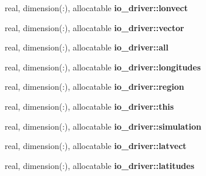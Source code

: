\begin{DoxyCompactItemize}
\item 
\hypertarget{namespaceio__driver_a2f85981326c1a44f2022a3573a859612}{}real, dimension(\+:), allocatable {\bfseries io\+\_\+driver\+::lonvect}\label{namespaceio__driver_a2f85981326c1a44f2022a3573a859612}

\item 
\hypertarget{namespaceio__driver_ae02998f9058178e7d11f21c8b331e76b}{}real, dimension(\+:), allocatable {\bfseries io\+\_\+driver\+::vector}\label{namespaceio__driver_ae02998f9058178e7d11f21c8b331e76b}

\item 
\hypertarget{namespaceio__driver_a2be06239621f5384fd771b03e3324973}{}real, dimension(\+:), allocatable {\bfseries io\+\_\+driver\+::all}\label{namespaceio__driver_a2be06239621f5384fd771b03e3324973}

\item 
\hypertarget{namespaceio__driver_ab8b0239125dd35fc419beb0c1e33fa1d}{}real, dimension(\+:), allocatable {\bfseries io\+\_\+driver\+::longitudes}\label{namespaceio__driver_ab8b0239125dd35fc419beb0c1e33fa1d}

\item 
\hypertarget{namespaceio__driver_a725f924d03078a609e67b3d75d8d8b7c}{}real, dimension(\+:), allocatable {\bfseries io\+\_\+driver\+::region}\label{namespaceio__driver_a725f924d03078a609e67b3d75d8d8b7c}

\item 
\hypertarget{namespaceio__driver_ab26a6cf5298cffd4593e08cf8c5fa069}{}real, dimension(\+:), allocatable {\bfseries io\+\_\+driver\+::this}\label{namespaceio__driver_ab26a6cf5298cffd4593e08cf8c5fa069}

\item 
\hypertarget{namespaceio__driver_acffb03fef3de7ce1cc537c8a46c6f2ce}{}real, dimension(\+:), allocatable {\bfseries io\+\_\+driver\+::simulation}\label{namespaceio__driver_acffb03fef3de7ce1cc537c8a46c6f2ce}

\item 
\hypertarget{namespaceio__driver_a584cb5f9e4ecded65f6bdf2dee9d2eba}{}real, dimension(\+:), allocatable {\bfseries io\+\_\+driver\+::latvect}\label{namespaceio__driver_a584cb5f9e4ecded65f6bdf2dee9d2eba}

\item 
\hypertarget{namespaceio__driver_a030548266e234075c85574f3dbd14191}{}real, dimension(\+:), allocatable {\bfseries io\+\_\+driver\+::latitudes}\label{namespaceio__driver_a030548266e234075c85574f3dbd14191}


\end{DoxyCompactItemize}
